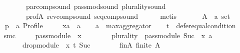\begin{isabellebody}
\ \ \ \ \ \ \ \ \ \ par{\isacharunderscore}{\kern0pt}comp{\isacharunderscore}{\kern0pt}sound\ pass{\isacharunderscore}{\kern0pt}mod{\isacharunderscore}{\kern0pt}sound\ plurality{\isacharunderscore}{\kern0pt}sound\isanewline
\ \ \ \ \ \ \ \ \ \ prof{\isacharunderscore}{\kern0pt}A\ rev{\isacharunderscore}{\kern0pt}comp{\isacharunderscore}{\kern0pt}sound\ seq{\isacharunderscore}{\kern0pt}comp{\isacharunderscore}{\kern0pt}sound\isanewline
\ \ \ \ \isamarkupfalse%
\ metis\isanewline
{}\isamarkupfalse%
\isanewline
\ \ \isamarkupfalse%
\isanewline
\ \ \ \ A\ {\isacharcolon}{\kern0pt}{\isacharcolon}{\kern0pt}\ {\isachardoublequoteopen}{\isacharprime}{\kern0pt}a\ set{\isachardoublequoteclose}\ \isanewline
\ \ \ \ p\ {\isacharcolon}{\kern0pt}{\isacharcolon}{\kern0pt}\ {\isachardoublequoteopen}{\isacharprime}{\kern0pt}a\ Profile{\isachardoublequoteclose}\ \isanewline
\ \ \ \ xa\ {\isacharcolon}{\kern0pt}{\isacharcolon}{\kern0pt}\ {\isachardoublequoteopen}{\isacharprime}{\kern0pt}a{\isachardoublequoteclose}\isanewline
\ \ \isamarkupfalse%
\ {\isacharquery}{\kern0pt}a\ {\isacharequal}{\kern0pt}\ {\isachardoublequoteopen}max{\isacharunderscore}{\kern0pt}aggregator{\isachardoublequoteclose}\isanewline
\ \ \isamarkupfalse%
\ {\isacharquery}{\kern0pt}t\ {\isacharequal}{\kern0pt}\ {\isachardoublequoteopen}defer{\isacharunderscore}{\kern0pt}equal{\isacharunderscore}{\kern0pt}condition{\isachardoublequoteclose}\isanewline
\ \ \isamarkupfalse%
\ {\isacharquery}{\kern0pt}smc\ {\isacharequal}{\kern0pt}\isanewline
\ \ \ \ {\isachardoublequoteopen}pass{\isacharunderscore}{\kern0pt}module\ {}\ x\ {\isasymtriangleright}\isanewline
\ \ \ \ \ \ \ {\isacharparenleft}{\kern0pt}{\isacharparenleft}{\kern0pt}plurality{\isasymdown}{\isacharparenright}{\kern0pt}\ {\isasymtriangleright}\ pass{\isacharunderscore}{\kern0pt}module\ {\isacharparenleft}{\kern0pt}Suc\ {}{\isacharparenright}{\kern0pt}\ x{\isacharparenright}{\kern0pt}\ {\isasymparallel}\isactrlsub {\isacharquery}{\kern0pt}a\isanewline
\ \ \ \ \ \ \ \ \ drop{\isacharunderscore}{\kern0pt}module\ {}\ x\ {\isasymcirclearrowleft}\isactrlsub {\isacharquery}{\kern0pt}t\ {\isacharparenleft}{\kern0pt}Suc\ {}{\isacharparenright}{\kern0pt}{\isachardoublequoteclose}\isanewline
\ \ \isamarkupfalse%
\isanewline
\ \ \ \ fin{\isacharunderscore}{\kern0pt}A{\isacharcolon}{\kern0pt}\ {\isachardoublequoteopen}finite\ A{\isachardoublequoteclose}\ \isanewline

\end{isabellebody}
